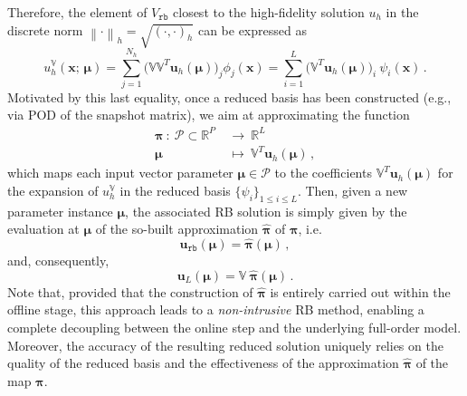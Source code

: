 \documentclass{elsarticle}
\numberwithin{equation}{section}
\theoremstyle{theorem}
\theoremstyle{definition}
\theoremstyle{remark}
\theoremstyle{proposition}
\numberwithin{figure}{section}
\newcommand{\norm}[1]{\left\lVert#1\right\rVert}
\newcommand{\bg}[1]{\boldsymbol{#1}}
\begin{document}
		Therefore, the element of $V_{\texttt{rb}}$ closest to the high-fidelity solution $u_h$ in the discrete norm $\norm{\cdot}_h = \sqrt{(\cdot,\cdot)_h}$ can be expressed as
		\begin{equation*}
			\label{eq:high-fidelity-projected}
			u^{\mathbb{V}}_h(\bg{x}; \, \bg{\mu}) = \sum_{j = 1}^{N_h} \big( \mathbb{V} \mathbb{V}^T \mathbf{u}_h(\bg{\mu}) \big)_j \phi_j(\bg{x}) = \sum_{i = 1}^L \big( \mathbb{V}^T \mathbf{u}_h(\bg{\mu}) \big)_i ~ \psi_i(\bg{x}) \, .
		\end{equation*} 
		Motivated by this last equality, once a reduced basis has been constructed (e.g., via POD of the snapshot matrix), we aim at approximating the function
		\begin{equation}
			\label{eq:map-to-approximate}
			\begin{aligned}
				\bg{\pi} ~ : ~ \mathcal{P} \subset \mathbb{R}^P ~ & \rightarrow ~ \mathbb{R}^L \\
				\bg{\mu} ~~ & \mapsto ~ \mathbb{V}^T \mathbf{u}_h(\bg{\mu}) \, ,
			\end{aligned}
		\end{equation}
		which maps each input vector parameter $\bg{\mu} \in \mathcal{P}$ to the coefficients $\mathbb{V}^T \mathbf{u}_h(\bg{\mu})$ for the expansion of $u^{\mathbb{V}}_h$ in the reduced basis $\big\lbrace \psi_i \big\rbrace_{1 \leq i \leq L}$. Then, given a new parameter instance $\bg{\mu}$, the associated RB solution is simply given by the evaluation at $\bg{\mu}$ of the so-built approximation $\hat{\bg{\pi}}$ of $\bg{\pi}$, i.e.
		\begin{equation*}
			\mathbf{u}_{\texttt{rb}}(\bg{\mu}) = \hat{\bg{\pi}}(\bg{\mu}) \, ,
		\end{equation*}
		and, consequently,
		\begin{equation*}
			\mathbf{u}_L(\bg{\mu}) = \mathbb{V} ~ \hat{\bg{\pi}}(\bg{\mu}) \, .
		\end{equation*}
		Note that, provided that the construction of $\hat{\bg{\pi}}$ is entirely carried out within the offline stage, this approach leads to a \emph{non-intrusive} RB method, enabling a complete decoupling between the online step and the underlying full-order model. Moreover, the accuracy of the resulting reduced solution uniquely relies on the quality of the reduced basis and the effectiveness of the approximation $\hat{\bg{\pi}}$ of the map $\bg{\pi}$. %
		
\end{document}
